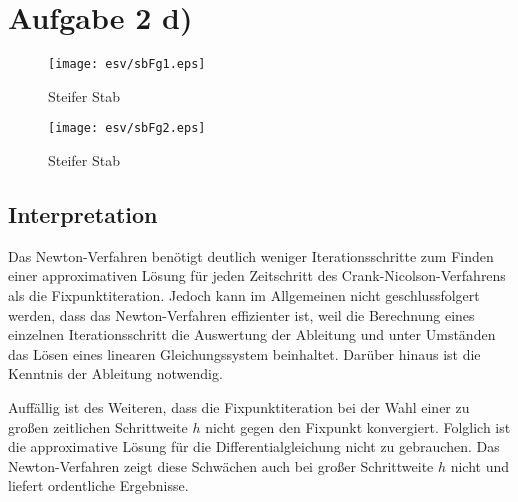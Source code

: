 \documentclass[german]{article}
\begin{document}
	\section*{Aufgabe 2 d)}
		\begin{figure}
		[H]
			\centerline{\texttt{[image: esv/sbFg1.eps]}}
			\caption{Steifer Stab}
		\end{figure}
		\begin{figure}
		[H]
			\centerline{\texttt{[image: esv/sbFg2.eps]}}
			\caption{Steifer Stab}
		\end{figure}
		
		\subsection*{Interpretation}
			Das Newton-Verfahren benötigt deutlich weniger Iterationsschritte zum Finden einer approximativen Lösung
			für jeden Zeitschritt des Crank-Nicolson-Verfahrens als die Fixpunktiteration. Jedoch kann im Allgemeinen
			nicht geschlussfolgert werden, dass das Newton-Verfahren effizienter ist, weil die Berechnung eines
			einzelnen Iterationsschritt die Auswertung der Ableitung und unter Umständen das Lösen eines linearen
			Gleichungssystem beinhaltet. Darüber hinaus ist die Kenntnis der Ableitung notwendig.
			
			Auffällig ist des Weiteren, dass die Fixpunktiteration bei der Wahl einer zu großen zeitlichen Schrittweite $h$
			nicht gegen den Fixpunkt konvergiert. Folglich ist die approximative Lösung für die Differentialgleichung nicht zu gebrauchen.
			Das Newton-Verfahren zeigt diese Schwächen auch bei großer Schrittweite $h$ nicht und liefert ordentliche Ergebnisse.
\end{document}
